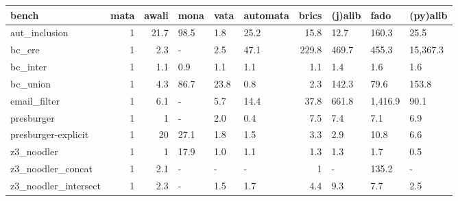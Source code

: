 \begin{tabular}{lrrlllrlll}
\hline
 bench                &   mata &   awali & mona   & vata   & automata   &   brics & (j)alib   & fado    & (py)alib   \\
\hline
 aut\_inclusion        &      1 &    21.7 & 98.5   & 1.8    & 25.2       &    15.8 & 12.7      & 160.3   & 25.5       \\
 bc\_ere               &      1 &     2.3 & -      & 2.5    & 47.1       &   229.8 & 469.7     & 455.3   & 15,367.3   \\
 bc\_inter             &      1 &     1.1 & 0.9    & 1.1    & 1.1        &     1.1 & 1.4       & 1.6     & 1.6        \\
 bc\_union             &      1 &     4.3 & 86.7   & 23.8   & 0.8        &     2.3 & 142.3     & 79.6    & 153.8      \\
 email\_filter         &      1 &     6.1 & -      & 5.7    & 14.4       &    37.8 & 661.8     & 1,416.9 & 90.1       \\
 presburger           &      1 &     1   & -      & 2.0    & 0.4        &     7.5 & 7.4       & 7.1     & 6.9        \\
 presburger-explicit  &      1 &    20   & 27.1   & 1.8    & 1.5        &     3.3 & 2.9       & 10.8    & 6.6        \\
 z3\_noodler           &      1 &     1   & 17.9   & 1.0    & 1.1        &     1.3 & 1.3       & 1.7     & 0.5        \\
 z3\_noodler\_concat    &      1 &     2.1 & -      & -      & -          &     1   & -         & 135.2   & -          \\
 z3\_noodler\_intersect &      1 &     2.3 & -      & 1.5    & 1.7        &     4.4 & 9.3       & 7.7     & 2.5        \\
\hline
\end{tabular}